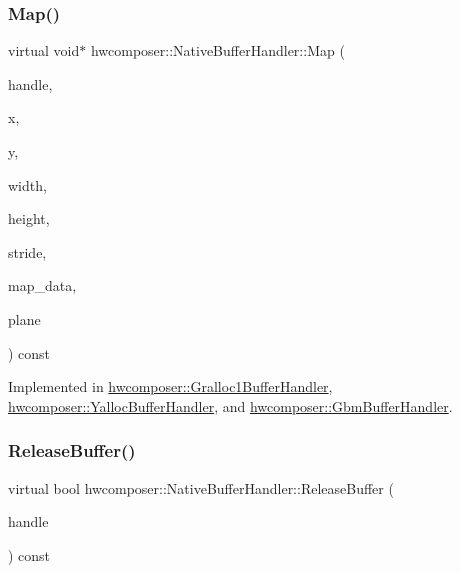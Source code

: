 \subsubsection{\texorpdfstring{Map()}{Map()}}
{\footnotesize\ttfamily virtual void$\ast$ hwcomposer\+::\+Native\+Buffer\+Handler\+::\+Map (\begin{DoxyParamCaption}\item[{\mbox{\hyperlink{alios_2platformdefines_8h_ac0a2eaf260f556d17fe489911f017bdf}{H\+W\+C\+Native\+Handle}}}]{handle,  }\item[{uint32\+\_\+t}]{x,  }\item[{uint32\+\_\+t}]{y,  }\item[{uint32\+\_\+t}]{width,  }\item[{uint32\+\_\+t}]{height,  }\item[{uint32\+\_\+t $\ast$}]{stride,  }\item[{void $\ast$$\ast$}]{map\+\_\+data,  }\item[{size\+\_\+t}]{plane }\end{DoxyParamCaption}) const\hspace{0.3cm}{\ttfamily [pure virtual]}}



Implemented in \mbox{\hyperlink{classhwcomposer_1_1Gralloc1BufferHandler_a55e32dbd6cc8c32cb3fd3cac11d3f9f8}{hwcomposer\+::\+Gralloc1\+Buffer\+Handler}}, \mbox{\hyperlink{classhwcomposer_1_1YallocBufferHandler_a855e524c54da7c897dfeb8dfabfdb29a}{hwcomposer\+::\+Yalloc\+Buffer\+Handler}}, and \mbox{\hyperlink{classhwcomposer_1_1GbmBufferHandler_ad6120de07407c36ed5ab99c8fcb628fd}{hwcomposer\+::\+Gbm\+Buffer\+Handler}}.

\mbox{\label{classhwcomposer_1_1NativeBufferHandler_abff911db92343545a36a0cc44a8d2eb8}} 
\subsubsection{\texorpdfstring{Release\+Buffer()}{ReleaseBuffer()}}
{\footnotesize\ttfamily virtual bool hwcomposer\+::\+Native\+Buffer\+Handler\+::\+Release\+Buffer (\begin{DoxyParamCaption}\item[{\mbox{\hyperlink{alios_2platformdefines_8h_ac0a2eaf260f556d17fe489911f017bdf}{H\+W\+C\+Native\+Handle}}}]{handle }\end{DoxyParamCaption}) const\hspace{0.3cm}{\ttfamily [pure virtual]}}



